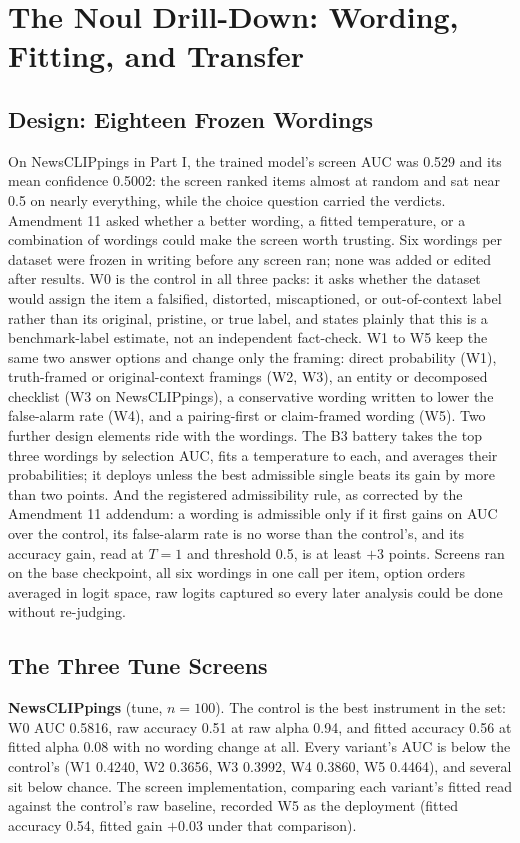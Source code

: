\documentclass{article} %
\begin{document}
\section{The Noul Drill-Down: Wording, Fitting, and Transfer}
\label{sec:noul}
\subsection{Design: Eighteen Frozen Wordings}
On NewsCLIPpings in Part I, the trained model's screen AUC was 0.529 and its mean confidence 0.5002: the screen ranked items almost at random and sat near 0.5 on nearly everything, while the choice question carried the verdicts. Amendment 11 asked whether a better wording, a fitted temperature, or a combination of wordings could make the screen worth trusting. Six wordings per dataset were frozen in writing before any screen ran; none was added or edited after results. W0 is the control in all three packs: it asks whether the dataset would assign the item a falsified, distorted, miscaptioned, or out-of-context label rather than its original, pristine, or true label, and states plainly that this is a benchmark-label estimate, not an independent fact-check. W1 to W5 keep the same two answer options and change only the framing: direct probability (W1), truth-framed or original-context framings (W2, W3), an entity or decomposed checklist (W3 on NewsCLIPpings), a conservative wording written to lower the false-alarm rate (W4), and a pairing-first or claim-framed wording (W5). Two further design elements ride with the wordings. The B3 battery takes the top three wordings by selection AUC, fits a temperature to each, and averages their probabilities; it deploys unless the best admissible single beats its gain by more than two points. And the registered admissibility rule, as corrected by the Amendment 11 addendum: a wording is admissible only if it first gains on AUC over the control, its false-alarm rate is no worse than the control's, and its accuracy gain, read at \(T=1\) and threshold 0.5, is at least \(+3\) points. Screens ran on the base checkpoint, all six wordings in one call per item, option orders averaged in logit space, raw logits captured so every later analysis could be done without re-judging.

\subsection{The Three Tune Screens}
\textbf{NewsCLIPpings} (tune, \(n=100\)). The control is the best instrument in the set: W0 AUC 0.5816, raw accuracy 0.51 at raw alpha 0.94, and fitted accuracy 0.56 at fitted alpha 0.08 with no wording change at all. Every variant's AUC is below the control's (W1 0.4240, W2 0.3656, W3 0.3992, W4 0.3860, W5 0.4464), and several sit below chance. The screen implementation, comparing each variant's fitted read against the control's raw baseline, recorded W5 as the deployment (fitted accuracy 0.54, fitted gain \(+0.03\) under that comparison).
\end{document}
